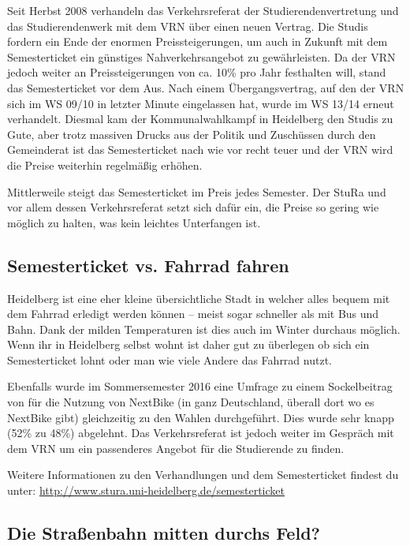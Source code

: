 Seit Herbst 2008 verhandeln das Verkehrsreferat der Studierendenvertretung und das Studierendenwerk mit dem VRN über einen neuen Vertrag. Die Studis fordern ein Ende der enormen Preissteigerungen, um auch in Zukunft mit dem Semesterticket ein günstiges Nahverkehrsangebot zu gewährleisten. Da der VRN jedoch weiter an Preissteigerungen von ca. 10\% pro Jahr festhalten will, stand das Semesterticket vor dem Aus. Nach einem Übergangsvertrag, auf den der VRN sich im WS 09/10 in letzter Minute eingelassen hat, wurde im WS 13/14 erneut verhandelt. Diesmal kam der Kommunalwahlkampf in Heidelberg den Studis zu Gute, aber trotz massiven Drucks aus der Politik und Zuschüssen durch den Gemeinderat ist das Semesterticket nach wie vor recht teuer und der VRN wird die Preise weiterhin regelmäßig erhöhen.

Mittlerweile steigt das Semesterticket im Preis jedes Semester. Der StuRa und vor allem dessen Verkehrsreferat setzt sich dafür ein, die Preise so gering wie möglich zu halten, was kein leichtes Unterfangen ist.

\subsection{Semesterticket vs. Fahrrad fahren}

Heidelberg ist eine eher kleine übersichtliche Stadt in welcher alles bequem mit dem Fahrrad erledigt werden können -- meist sogar schneller als mit Bus und Bahn. Dank der milden Temperaturen ist dies auch im Winter durchaus möglich. Wenn ihr in Heidelberg selbst wohnt ist daher gut zu überlegen ob sich ein Semesterticket lohnt oder man wie viele Andere das Fahrrad nutzt.

Ebenfalls wurde im Sommersemester 2016 eine Umfrage zu einem Sockelbeitrag von  für die Nutzung von NextBike (in ganz Deutschland, überall dort wo es NextBike gibt) gleichzeitig zu den Wahlen durchgeführt. Dies wurde sehr knapp (52\% zu 48\%) abgelehnt. Das Verkehrsreferat ist jedoch weiter im Gespräch mit dem VRN um ein passenderes Angebot für die Studierende zu finden.

Weitere Informationen zu den Verhandlungen und dem Semesterticket findest du unter: \url{http://www.stura.uni-heidelberg.de/semesterticket}

\subsection{Die Straßenbahn mitten durchs Feld?}

